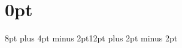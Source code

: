 \renewcommand{\arraystretch}{1.2}

\theoremstyle{plain}
\newtheorem*{definition*}{Definition}

\newcommand{\Rm}{\textsc{RMinimum} }
\newcommand{\RM}{\textsc{RMedian} }
\newcommand{\fg}{\textit{Fragile Complexity} }

\titlespacing\section{0pt}{8pt plus 4pt minus 2pt}{12pt plus 2pt minus 2pt}
\newtheorem{manualtheoreminner}{Theorem}
\newenvironment{manualtheorem}[1]{%
  \renewcommand\themanualtheoreminner{#1}%
  \manualtheoreminner
}{\endmanualtheoreminner}

\newtheorem{manuallemmainner}{Lemma}
\newenvironment{manuallemma}[1]{%
  \renewcommand\themanuallemmainner{#1}%
  \manuallemmainner
}{\endmanuallemmainner}

\newtheorem{manualcorollaryinner}{Korollar}
\newenvironment{manualcorollary}[1]{%
  \renewcommand\themanualcorollaryinner{#1}%
  \manualcorollaryinner
}{\endmanualcorollaryinner}

\newtheorem{manualdefinitioninner}{Definition}
\newenvironment{manualdefinition}[1]{%
  \renewcommand\themanualdefinitioninner{#1}%
  \manualdefinitioninner
}{\endmanualdefinitioninner}

\newcommand{\mO}{\mathcal{O}}